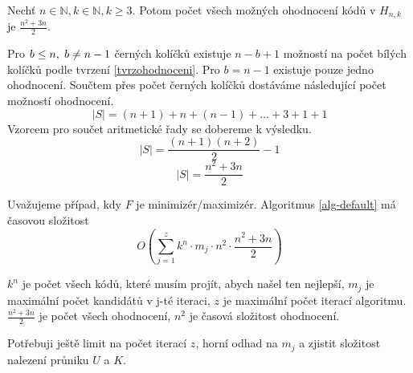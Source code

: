 \begin{tvrz}
Nechť $n\in \mathbb{N}, k\in \mathbb{N}, k \geq 3$. Potom počet všech možných ohodnocení kódů v $H_{n,k}$ je $\frac{n^2 + 3n}{2}$.
\end{tvrz}
\begin{dukaz}
Pro $b \leq n,\hspace{3px} b \neq n-1$ černých kolíčků existuje $n-b+1$ možností na počet bílých kolíčků podle tvrzení \ref{tvrzohodnoceni}. Pro $b = n-1$ existuje pouze jedno ohodnocení. Součtem přes počet černých kolíčků dostáváme následující počet možností ohodnocení.
    \[|S| = (n+1) + n + (n-1)  + \dots + 3 + 1 + 1 \]
Vzorcem pro součet aritmetické řady se dobereme k výsledku.
    \[|S| = \frac{(n+1)(n+2)}{2} - 1 \]
    \[|S| = \frac{n^2 + 3n}{2}\]
\end{dukaz}

\begin{tvrz}
    Uvažujeme případ, kdy $F$ je minimizér/maximizér.
    Algoritmus \ref{alg-default} má časovou složitost
    \[O \left( \sum_{j = 1}^z k^n \cdot m_j \cdot n^2 \cdot \frac{n^2 + 3n}{2}\right)\]
    
\end{tvrz}
\begin{dukaz}
    $k^n$ je počet všech kódů, které musím projít, abych našel ten nejlepší, $m_j$ je maximální počet kandidátů v j-té iteraci, $z$ je maximální počet iterací algoritmu. $\frac{n^2 + 3n}{2}$ je počet všech ohodnocení, $n^2$ je časová složitost ohodnocení.

    Potřebuji ještě limit na počet iterací $z$, horní odhad na $m_j$ a zjistit složitost nalezení průniku $U$ a $K$.
\end{dukaz}

